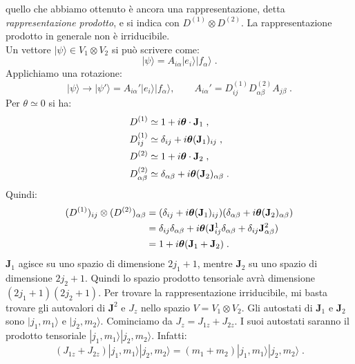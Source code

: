 \documentclass[12pt,a4paper]{report}
\theoremstyle{definition}
\numberwithin{equation}{section}
\newcommand{\ket}{\rangle}
\begin{document}
quello che abbiamo ottenuto è ancora una rappresentazione, detta \textit{rappresentazione prodotto}, e si indica con $D^{(1)}\otimes D^{(2)}$. La rappresentazione prodotto in generale non è irriducibile.\\
Un vettore $|\psi\ket\in V_1\otimes V_2$ si può scrivere come:
\begin{equation}
|\psi\ket=A_{i\alpha}|e_i\ket|f_{\alpha}\ket\;.
\end{equation}
Applichiamo una rotazione:
\begin{equation}
|\psi\ket \longrightarrow |\psi'\ket= A_{i\alpha}'|e_i\ket|f_{\alpha}\ket, \qquad A_{i\alpha}'=D_{ij}^{(1)}D_{\alpha\beta}^{(2)}A_{j\beta}\;.
\end{equation}
Per $\theta \simeq 0$ si ha:
\begin{align}
D^{(1)} &\simeq 1+i\boldsymbol{\theta}\cdot \mathbf{J}_1\;, \notag \\
D_{ij}^{(1)} &\simeq \delta_{ij}+i\boldsymbol{\theta}(\mathbf{J}_1)_{ij} \notag\;, \\
D^{(2)} &\simeq 1+i\boldsymbol{\theta}\cdot\mathbf{J}_2 \notag\;, \\
D_{\alpha\beta}^{(2)} &\simeq \delta_{\alpha\beta}+i\boldsymbol{\theta}(\mathbf{J}_2)_{\alpha\beta}\;.
\end{align}
Quindi:
\begin{align}
(D^{(1)})_{ij}\otimes (D^{(2)})_{\alpha\beta} &= (\delta_{ij}+i\boldsymbol{\theta}(\mathbf{J}_1)_{ij})(\delta_{\alpha\beta}+i\boldsymbol{\theta}(\mathbf{J}_2)_{\alpha\beta}) \notag \\
&= \delta_{ij}\delta_{\alpha\beta}+i\boldsymbol{\theta}(\mathbf{J}^1_{ij}\delta_{\alpha\beta}+\delta_{ij}\mathbf{J}^2_{\alpha\beta})  \notag \\
&= 1+i\boldsymbol{\theta}(\mathbf{J}_1+\mathbf{J}_2)\;.
\end{align}
$\mathbf{J}_1$ agisce su uno spazio di dimensione $2j_1+1$, mentre $\mathbf{J}_2$ su uno spazio di dimensione $2j_2+1$. Quindi lo spazio prodotto tensoriale avrà dimensione $(2j_1+1)(2j_2+1)$. Per trovare la rappresentazione irriducibile, mi basta trovare gli autovalori di $\mathbf{J}^2$ e $J_z$ nello spazio $V=V_1\otimes V_2$. Gli autostati di $\mathbf{J}_1$ e $\mathbf{J}_2$ sono $|j_1,m_1\ket$ e $|j_2,m_2\ket$. Cominciamo da $J_z=J_{1z}+J_{2z}$. I suoi autostati saranno il prodotto tensoriale $|j_1,m_1\ket|j_2,m_2\ket$. Infatti:
\begin{equation}
(J_{1z}+J_{2z})|j_1,m_1\ket|j_2,m_2\ket=(m_1+m_2)|j_1,m_1\ket|j_2,m_2\ket\;.
\end{equation}
\end{document}
